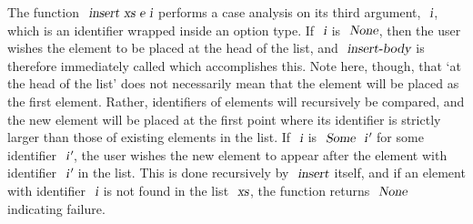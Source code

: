 \documentclass[acmlarge,review,anonymous]{acmart}\settopmatter{printfolios=true}
\begin{document}
The function $\isa{insert\ xs\ e\ i}$ performs a case analysis on its third argument, $\isa{i}$, which is an identifier wrapped inside an option type.
If $\isa{i}$ is $\isa{None}$, then the user wishes the element to be placed at the head of the list, and $\isa{insert-body}$ is therefore immediately called which accomplishes this.
Note here, though, that `at the head of the list' does not necessarily mean that the element will be placed as the first element.
Rather, identifiers of elements will recursively be compared, and the new element will be placed at the first point where its identifier is strictly larger than those of existing elements in the list.
If $\isa{i}$ is $\isa{Some}\ \isa{i}{\isacharprime}$ for some identifier $\isa{i}{\isacharprime}$, the user wishes the new element to appear after the element with identifier $\isa{i}{\isacharprime}$ in the list.
This is done recursively by $\isa{insert}$ itself, and if an element with identifier $\isa{i}$ is not found in the list $\isa{xs}$, the function returns $\isa{None}$ indicating failure.
\end{document}
